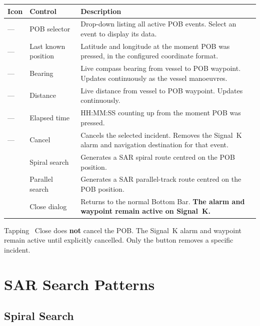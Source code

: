 \begin{longtable}{C{1.4cm}L{3.0cm}L{9.3cm}}
\toprule
{}
\color{white}\sffamily\bfseries Icon &
\color{white}\sffamily\bfseries Control &
\color{white}\sffamily\bfseries Description \\
\midrule
---                      & POB selector     &
  Drop-down listing all active POB events.
  Select an event to display its data. \\
---                      & Last known position &
  Latitude and longitude at the moment POB was pressed,
  in the configured coordinate format. \\
---                      & Bearing          &
  Live compass bearing from vessel to POB waypoint.
  Updates continuously as the vessel manoeuvres. \\
---                      & Distance         &
  Live distance from vessel to POB waypoint. Updates continuously. \\
---                      & Elapsed time     &
  HH:MM:SS counting up from the moment POB was pressed. \\
---                      & Cancel           &
  Cancels the selected incident.
  Removes the Signal~K alarm and navigation destination for that event. \\
   & Spiral search    &
  Generates a SAR spiral route centred on the POB position. \\
 & Parallel search  &
  Generates a SAR parallel-track route centred on the POB position. \\
    & Close dialog     &
  Returns to the normal Bottom Bar.
  \textbf{The alarm and waypoint remain active on Signal~K.} \\
\bottomrule
\end{longtable}

\begin{warningbox}
Tapping ~Close does \textbf{not} cancel the POB.
The Signal~K alarm and waypoint remain active until explicitly cancelled.
Only the  button removes a specific incident.
\end{warningbox}

\section{SAR Search Patterns}

\subsection{Spiral Search}

